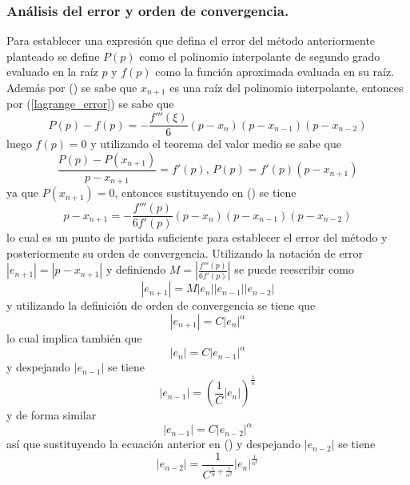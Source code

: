 \subsubsection{Análisis del error y orden de convergencia.}
Para establecer una expresión que defina el error del método anteriormente planteado se define $P(p)$
como el polinomio interpolante de segundo grado evaluado en la raíz $p$ y $f(p)$ como la función aproximada
evaluada en su raíz. Además por () se sabe que $x_{n+1}$ es una raíz del polinomio
interpolante, entonces por (\ref{lagrange_error}) se sabe que
\begin{equation}
    \label{error_muller_eq1}
    P(p)-f(p)=-\frac{f'''(\xi)}{6}(p-x_n)(p-x_{n-1})(p-x_{n-2})
\end{equation}
luego $f(p)=0$ y utilizando el teorema del valor medio se sabe que 
\[\frac{P(p)-P(x_{n+1})}{p-x_{n+1}}=f'(p),\,P(p)=f'(p)(p-x_{n+1})\]
ya que $P(x_{n+1})=0$, entonces sustituyendo en () se tiene
\begin{equation}
    \label{error_muller_eq2}
    p-x_{n+1}=-\frac{f'''(p)}{6f'(p)}(p-x_n)(p-x_{n-1})(p-x_{n-2})
\end{equation}
lo cual es un punto de partida suficiente para establecer el error del método y 
posteriormente su orden de convergencia. Utilizando la notación de error $|e_{n+1}|=|p-x_{n+1}|$
y definiendo $M=|\frac{f'''(p)}{6f'(p)}|$ se puede reescribir  como
\begin{equation}
    \label{error_muller}
    |e_{n+1}|=M|e_{n}||e_{n-1}||e_{n-2}|
\end{equation}
y utilizando la definición de orden de convergencia se tiene que
\begin{equation}
    \label{error_e0}
    |e_{n+1}|=C|e_n|^\alpha
\end{equation}
lo cual implica también que
\begin{equation}
    \label{error_e1}
    |e_n|=C|e_{n-1}|^\alpha
\end{equation}
y despejando $|e_{n-1}|$ se tiene
\begin{equation}
    \label{error_e2}
    |e_{n-1}|=\left(\frac{1}{C}|e_n|\right)^\frac{1}{\alpha}
\end{equation}
y de forma similar 
\[|e_{n-1}|=C|e_{n-2}|^\alpha\]
así que sustituyendo la ecuación anterior en () y despejando $|e_{n-2}|$ se tiene
\begin{equation}
    \label{error_e3}
    |e_{n-2}|=\frac{1}{C^{\frac{1}{\alpha}+\frac{1}{\alpha^2}}}|e_n|^{\frac{1}{\alpha^2}}
\end{equation}
